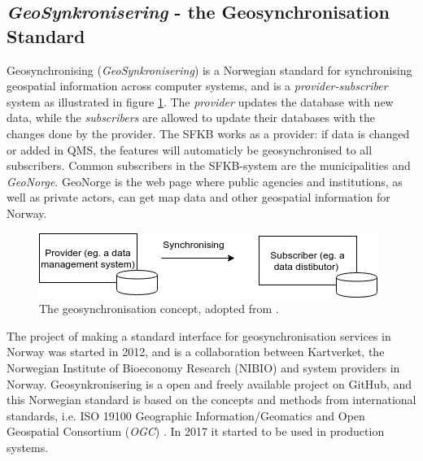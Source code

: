 


\subsection{\textit{GeoSynkronisering} - the Geosynchronisation Standard}\label{geosync}

Geosynchronising (\textit{GeoSynkronisering}) is a Norwegian standard for synchronising geospatial information across computer systems, and is a \textit{provider-subscriber} system as illustrated in figure \ref{fig:geosync}. The \textit{provider} updates the database with new data, while the \textit{subscribers} are allowed to update their databases with the changes done by the provider. The SFKB works as a provider: if data is changed or added in QMS, the features will automaticly be geosynchronised to all subscribers. Common subscribers in the SFKB-system are the municipalities and \textit{GeoNorge}. GeoNorge is the web page where public agencies and institutions, as well as private actors, can get map data and other geospatial information for Norway.  
\\
\begin{figure}[H]
	\centering
	\includegraphics[scale=0.6]{img/geosync.png}
	\caption{The geosynchronisation concept, adopted from \cite[p.~16]{Kartverket2013}. }
	\label{fig:geosync}
\end{figure}


The project of making a standard interface for geosynchronisation services in Norway was started in 2012, and is a collaboration between Kartverket, the Norwegian Institute of Bioeconomy Research (NIBIO) and system providers in Norway. Geosynkronisering is a open and freely available project on GitHub, and this Norwegian standard is based on the concepts and methods from international standards, i.e. ISO 19100 Geographic Information/Geomatics and Open Geospatial Consortium (\textit{OGC}) \citep{Eggan2017,Kartverket2013}. In 2017 it started to be used in production systems. 

